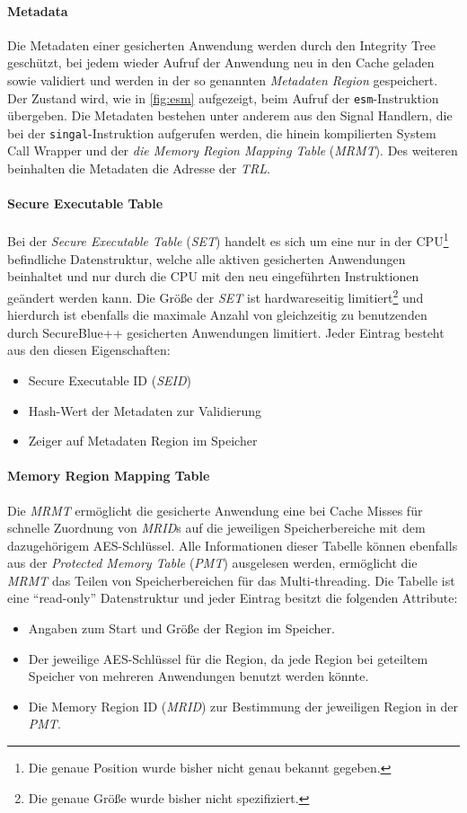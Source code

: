 \documentclass[ngerman]{sig-alternate-05-2015}
\begin{document}
\paragraph{Metadata}
\label{sec:metadata}
Die Metadaten einer gesicherten Anwendung werden durch den Integrity Tree geschützt, bei jedem wieder Aufruf der Anwendung neu in den Cache geladen sowie validiert und werden in der so genannten \emph{Metadaten Region} gespeichert. Der Zustand wird, wie in \cref{fig:esm} aufgezeigt, beim Aufruf der \texttt{esm}-Instruktion übergeben. Die Metadaten bestehen unter anderem aus den Signal Handlern, die bei der \texttt{singal}-Instruktion aufgerufen werden, die hinein kompilierten System Call Wrapper und der \emph{die Memory Region Mapping Table} (\emph{MRMT}). Des weiteren beinhalten die Metadaten die Adresse der \emph{TRL}.

\paragraph{Secure Executable Table}
Bei der \emph{Secure Executable Table} (\emph{SET}) handelt es sich um eine nur in der CPU\footnote{\label{foot:ungenau}Die genaue Position wurde bisher nicht genau bekannt gegeben.} befindliche Datenstruktur, welche alle aktiven gesicherten Anwendungen beinhaltet und nur durch die CPU mit den neu eingeführten Instruktionen geändert werden kann. Die Größe der \emph{SET} ist hardwareseitig limitiert\footnote{Die genaue Größe wurde bisher nicht spezifiziert.} und hierdurch ist ebenfalls die maximale Anzahl von gleichzeitig zu benutzenden durch SecureBlue++ gesicherten Anwendungen limitiert. Jeder Eintrag besteht aus den diesen Eigenschaften:
\begin{itemize}
	\item Secure Executable ID (\emph{SEID})
	\item Hash-Wert der Metadaten zur Validierung
	\item Zeiger auf Metadaten Region im Speicher
\end{itemize}

\paragraph{Memory Region Mapping Table}
Die \emph{MRMT} ermöglicht die gesicherte Anwendung eine bei Cache Misses für  schnelle Zuordnung von \emph{MRID}s auf die jeweiligen Speicherbereiche mit dem dazugehörigem AES-Schlüssel. Alle Informationen dieser Tabelle können ebenfalls aus der \emph{Protected Memory Table} (\emph{PMT}) ausgelesen werden, ermöglicht die \emph{MRMT} das Teilen von Speicherbereichen für das Multi-threading. Die Tabelle ist eine \enquote{read-only} Datenstruktur und jeder Eintrag besitzt die folgenden Attribute:
\begin{itemize}
	\item Angaben zum Start und Größe der Region im Speicher.
	\item Der jeweilige AES-Schlüssel für die Region, da jede Region bei geteiltem Speicher von mehreren Anwendungen benutzt werden könnte.
	\item Die Memory Region ID (\emph{MRID}) zur Bestimmung der jeweiligen Region in der \emph{PMT}.
\end{itemize}
\end{document}
